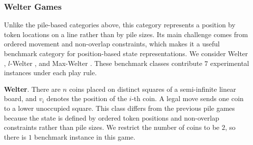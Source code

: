 \documentclass[review]{elsarticle}
\newcommand{\set}[1]{\{ #1 \}}
\newcommand{\tuple}[1]{\langle {#1} \rangle}
\newcommand{\true}{\top}
\newcommand{\statevar}{\mathcal{X}}
\newcommand{\act}{\mathcal{A}}
\newcommand{\constraint}{\mathcal{C}}
\newcommand{\estate}{\mathcal{E}}
\newcommand{\pre}{\mathtt{pre}}
\newcommand{\eff}{\mathtt{eff}}
\begin{document}
{\color{red}\subsubsection{Welter Games}}
{\color{red}Unlike the pile-based categories above, this category represents a position by token locations on a line rather than by pile sizes.}
{\color{red}Its main challenge comes from ordered movement and non-overlap constraints, which makes it a useful benchmark category for position-based state representations.}
{\color{red}We consider Welter \cite{Wel1952}, $l$-Welter \cite{KahF1987}, and Max-Welter \cite{Ho2014}.}
{\color{red}These benchmark classes contribute $7$ experimental instances under each play rule.}

{\color{red}\textbf{Welter}. There are $n$ coins placed on distinct squares of a semi-infinite linear board, and $v_i$ denotes the position of the $i$-th coin.}
{\color{red}A legal move sends one coin to a lower unoccupied square.}
{\color{red}This class differs from the previous pile games because the state is defined by ordered token positions and non-overlap constraints rather than pile sizes.}
{\color{red}We restrict the number of coins to be $2$, so there is $1$ benchmark instance in this game.}
\end{document}
